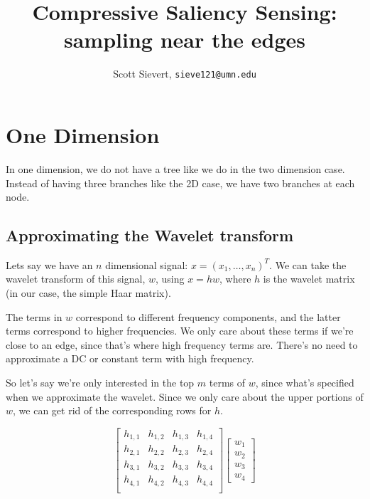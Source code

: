 \documentclass{article}
\title{Compressive Saliency Sensing: sampling near the edges}
\date{}
\author{Scott Sievert, \texttt{sieve121@umn.edu}}
\begin{document}
    \maketitle
    \tableofcontents
    \hrulefill

    \section{One Dimension}
        In one dimension, we do not have a tree like we do in the two dimension case. Instead of having three branches like the 2D case, we have two branches at each node.

        \subsection{Approximating the Wavelet transform}

            Lets say we have an $n$ dimensional signal: $x = (x_1,\ldots,x_n)^T$. We can take the wavelet transform of this signal, $w$, using $x = h w$, where $h$ is the wavelet matrix (in our case, the simple Haar matrix).

            The terms in $w$ correspond to different frequency components, and the latter terms correspond to higher frequencies. We only care about these terms if we're close to an edge, since that's where high frequency terms are. There's no need to approximate a DC or constant term with high frequency.

            So let's say we're only interested in the top $m$ terms of $w$, since what's specified when we approximate the wavelet. Since we only care about the upper portions of $w$, we can get rid of the corresponding rows for $h$.

            $$ 
                \begin{bmatrix}  
                    h_{1,1} & h_{1,2} &h_{1,3} &h_{1,4} \\
                    h_{2,1} & h_{2,2} &h_{2,3} &h_{2,4} \\
                    h_{3,1} & h_{3,2} &h_{3,3} &h_{3,4} \\
                    h_{4,1} & h_{4,2} &h_{4,3} &h_{4,4} \\
                
                \end{bmatrix}
                \begin{bmatrix}
                    w_1 \\ w_2 \\ w_3 \\ w_4
                \end{bmatrix}
            $$
\end{document}
